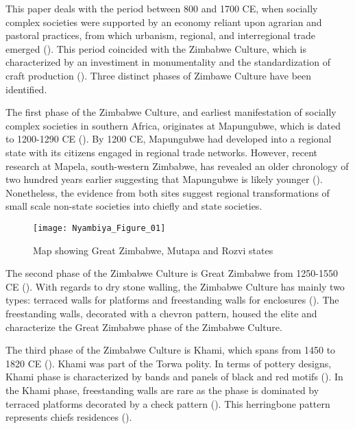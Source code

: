 This paper deals with the period between 800 and 1700 CE, when socially complex societies were supported by an economy reliant upon agrarian and pastoral practices, from which urbanism,  regional, and interregional trade emerged (\cites[][]{huffman1986}[][]{pwiti2005}[][]{mitchell2002}). This period coincided with the Zimbabwe Culture, which is characterized by an investiment in monumentality and the standardization of craft production (\cites[][]{pikirayi2001}[][]{pikirayi2013archit}[][]{huffman1996}[][]{kim2008}). Three distinct phases of Zimbawe Culture have been identified.

The first phase of the Zimbabwe Culture, and earliest manifestation of socially complex societies in southern Africa, originates at Mapungubwe, which is dated to 1200-1290 CE (\cites[][]{pwiti2005}[][]{pikirayi2006}[][]{kim2008}[][]{chirikure2014}[][]{huffman2015}). By 1200 CE, Mapungubwe had developed into a  regional state with its citizens engaged in regional trade networks.  However, recent research at Mapela, south-western Zimbabwe, has revealed an older chronology of two hundred years earlier suggesting that Mapungubwe is likely younger (\cites[][]{chirikure2013socio}[][]{chirikure2014}).
 Nonetheless, the evidence from both sites suggest  regional transformations of small scale non-state societies into chiefly and state societies.

\begin{figure}[!htb]
	\texttt{[image: Nyambiya\_Figure\_01]}
	\caption{Map showing Great Zimbabwe, Mutapa and Rozvi states
		{\normalfont\scriptsize %
	}}
	\label{fig:Nyambiya_Figure_01}
\end{figure}

The second phase of the Zimbabwe Culture is Great Zimbabwe from 1250-1550 CE (\cites[][]{pikirayi2006}[][]{kim2008}). With regards to dry stone walling, the Zimbabwe Culture has mainly two types: terraced walls for platforms and freestanding walls for enclosures (\cite[][]{chirikure2013socio}). The freestanding walls, decorated with a chevron pattern, housed the elite and characterize the Great Zimbabwe phase of the Zimbabwe Culture.

The third phase of the Zimbabwe Culture is Khami, which spans from 1450 to 1820 CE (\cites[][]{manyanga2006}[][]{chirikure2014}).  Khami was  part of the Torwa polity. In terms of pottery designs, Khami phase is characterized by bands and panels of black and red motifs (\cites[][]{huffman2011}[][]{chirikure2013socio}). In the Khami phase, freestanding walls are rare as the phase is dominated by terraced platforms decorated by a check pattern (\cites[][]{huffman2011}[][]{huffman2012}[][]{chirikure2013socio}). This herringbone pattern represents chiefs residences (\cites[][]{pikirayi2007}[][]{huffman2011}).

